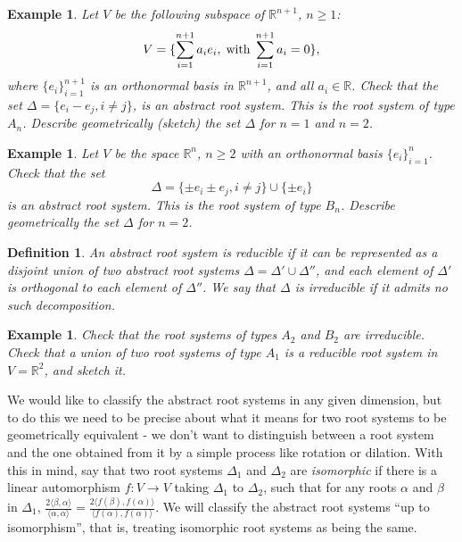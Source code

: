 \documentclass[11pt]{amsart}
\newcommand{\R}{\mathbb R}
\newcommand{\la}{\langle}
\newcommand{\ra}{\rangle}
\newtheorem{definition}[theorem]{Definition}
\newtheorem{example}[theorem]{Example}
\begin{document}
\begin{example} Let $V$ be the following subspace of $\R^{n+1}$, $n \geq 1$:
$$ V = \{ \sum_{i=1}^{n+1} a_i e_i, \;{\rm with}\; \sum_{i=1}^{n+1}a_i =0 
\},$$ 
where $\{e_i\}_{i=1}^{n+1}$ is an orthonormal basis in $\R^{n+1}$, and all 
$a_i \in \R$. 
Check that the set $\Delta = \{e_i - e_j, i\neq j \}$, is an abstract 
root system. This is the root system of type $A_n$. 
Describe geometrically (sketch) the set $\Delta$ for $n=1$ and $n=2$.  
\end{example}   

\begin{example} Let $V$ be the space $\R^n$, $n \geq 2$ with an orthonormal 
basis $\{e_i\}_{i=1}^n$. Check that the set 
$$\Delta = \{ \pm e_i \pm e_j , i \neq j \} \cup \{ \pm e_i \} $$ 
is an abstract root system. This is the root system of type $B_n$.  
Describe geometrically the set $\Delta$ for $n=2$. 
\end{example} 

\begin{definition} An abstract root system is \emph{reducible} if it can be 
represented as a disjoint union of two abstract root systems 
$\Delta = \Delta' \cup \Delta''$, and each element of $\Delta' $ 
is orthogonal to each element of $\Delta''$. We say that $\Delta$ 
is \emph{irreducible} if it admits no such decomposition.  
\end{definition} 

\begin{example} \label{R^2}
Check that the root systems of types $A_2$ and $B_2$ are 
irreducible. Check that a union of two root systems of type $A_1$ 
is a reducible root system in $V = \R^2$, and sketch it. 
\end{example} 

We would like to classify the abstract root systems in any given dimension,
but to do this we need to be precise about what it means for two root
systems to be geometrically equivalent - we don't want to distinguish
between a root system and the one obtained from it by a simple process like
rotation or dilation.  With this in mind, say that two root systems 
$\Delta_1$ and $\Delta_2$ are 
\emph{isomorphic} if there is a linear automorphism
$f: V \to V$ taking $\Delta_1$ to $\Delta_2$,
such that for any roots $\alpha$ and $\beta$ in $\Delta_1$, 
$\frac{2 \la \beta, \alpha \ra }{\la \alpha, \alpha \ra} =
\frac{2 \la f(\beta), f(\alpha) \ra }{\la f(\alpha), f(\alpha) \ra}$.
We will classify the abstract root systems ``up to isomorphism'', 
that is, treating isomorphic root systems as being the same.
\end{document}
